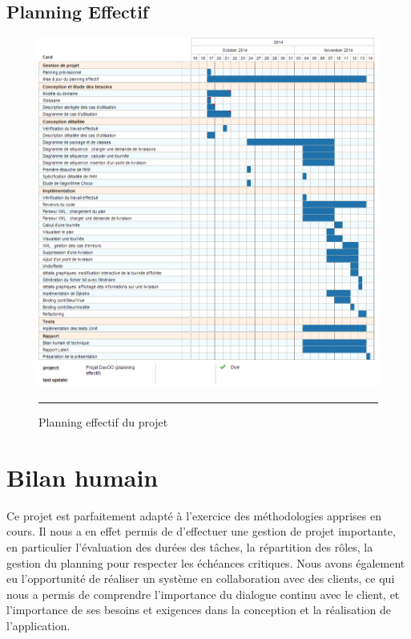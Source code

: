 \subsection{Planning Effectif}
\begin{figure}[htbp]
	\centering
		\includegraphics[width=\textwidth,height=\textheight,keepaspectratio]{Figures/effective_plan}
		\rule{35em}{0.5pt}
	\caption[Planning effectif du projet]{Planning effectif du projet}
\end{figure}
\clearpage


\section{Bilan humain}



Ce projet est parfaitement adapté à l'exercice des méthodologies apprises en cours. Il nous a en effet permis de d'effectuer une gestion de projet importante, en particulier l'évaluation des durées des tâches, la répartition des rôles, la gestion du planning pour respecter les échéances critiques.
Nous avons également eu l'opportunité de réaliser un système en collaboration avec des clients, ce qui nous a permis de comprendre l'importance du dialogue continu avec le client, et l'importance de ses besoins et exigences dans la conception et la réalisation de l'application. 




